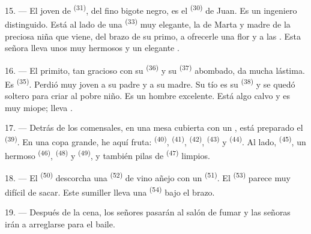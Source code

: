 15. --- El joven de  \textsuperscript{(31)}, del fino bigote negro, es
el  \textsuperscript{(30)} de Juan. Es un ingeniero distinguido. Está
al lado de una  \textsuperscript{(33)} muy elegante, la
 de Marta y madre de la preciosa niña que viene, del
brazo de su primo, a ofrecerle una flor y a  las
. Esta señora lleva unos  muy
hermosos y un elegante .

16. --- El primito, tan gracioso con su  \textsuperscript{(36)} y su
 \textsuperscript{(37)} abombado, da mucha lástima. Es
 \textsuperscript{(35)}. Perdió muy joven a su padre y a su madre.
Su tío es su  \textsuperscript{(38)} y se quedó soltero para criar al
pobre niño. Es un hombre excelente. Está algo calvo y es muy miope; lleva
.

\VUsaut{2.4mm}
\VUsaut{3.0mm}

17. --- Detrás de los comensales, en una mesa cubierta con un
, está preparado el  \textsuperscript{(39)}. En una
copa grande, he aquí fruta:  \textsuperscript{(40)},
 \textsuperscript{(41)},  \textsuperscript{(42)},
 \textsuperscript{(43)} y  \textsuperscript{(44)}. Al lado,
 \textsuperscript{(45)}, un hermoso  \textsuperscript{(46)},
 \textsuperscript{(48)} y  \textsuperscript{(49)}, y
también pilas de  \textsuperscript{(47)} limpios.

18. --- El  \textsuperscript{(50)} descorcha una 
\textsuperscript{(52)} de vino añejo con un  \textsuperscript{(51)}. El
 \textsuperscript{(53)} parece muy difícil de sacar. Este sumiller
lleva una  \textsuperscript{(54)} bajo el brazo.

19. --- Después de la cena, los señores pasarán al salón de fumar y las
señoras irán a arreglarse para el baile.

\VUsaut{5.0mm}
\VUsaut{1.6mm}
\VUsaut{2.6mm}


